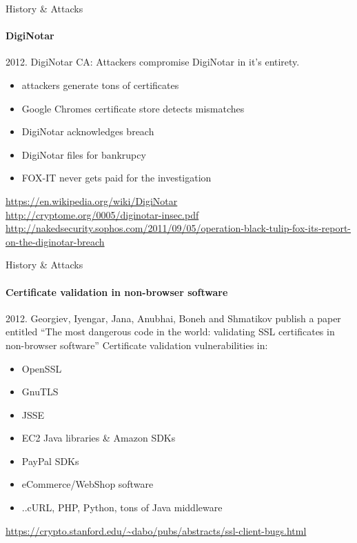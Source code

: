 \documentclass[hyperref={draft}]{beamer}
\begin{document}
\begin{frame}{History \& Attacks}
  \framesubtitle{DigiNotar}
  2012. DigiNotar CA: Attackers compromise DigiNotar in it's entirety.

  \begin{itemize}
    \item attackers generate tons of certificates
    \item Google Chromes certificate store detects mismatches
    \item DigiNotar acknowledges breach
    \item DigiNotar files for bankrupcy
    \item FOX-IT never gets paid for the investigation
  \end{itemize}


  \vspace{30px}

  \tiny
  \url{https://en.wikipedia.org/wiki/DigiNotar}\\
  \url{http://cryptome.org/0005/diginotar-insec.pdf}\\
  \url{http://nakedsecurity.sophos.com/2011/09/05/operation-black-tulip-fox-its-report-on-the-diginotar-breach}\

\end{frame}

\begin{frame}{History \& Attacks}
  \framesubtitle{Certificate validation in non-browser software}
  2012. Georgiev, Iyengar, Jana, Anubhai, Boneh and Shmatikov publish a paper entitled ``The most dangerous code in the world: validating SSL certificates in non-browser software''
  \newline
  \newline
  Certificate validation vulnerabilities in:
  \begin{itemize}
    \item OpenSSL
    \item GnuTLS
    \item JSSE
    \item EC2 Java libraries \& Amazon SDKs
    \item PayPal SDKs
    \item eCommerce/WebShop software
    \item ..cURL, PHP, Python, tons of Java middleware
  \end{itemize}

  \tiny
  \url{https://crypto.stanford.edu/~dabo/pubs/abstracts/ssl-client-bugs.html}
\end{frame}
\end{document}

